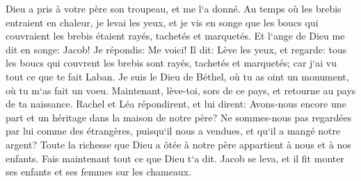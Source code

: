\verse Dieu a pris à votre père son troupeau, et me l`a donné. 
\verse Au temps où les brebis entraient en chaleur, je levai les yeux, et je vis en songe que les boucs qui couvraient les brebis étaient rayés, tachetés et marquetés. 
\verse Et l`ange de Dieu me dit en songe: Jacob! Je répondis: Me voici! 
\verse Il dit: Lève les yeux, et regarde: tous les boucs qui couvrent les brebis sont rayés, tachetés et marquetés; car j`ai vu tout ce que te fait Laban. 
\verse Je suis le Dieu de Béthel, où tu as oint un monument, où tu m`as fait un voeu. Maintenant, lève-toi, sors de ce pays, et retourne au pays de ta naissance. 
\verse Rachel et Léa répondirent, et lui dirent: Avons-nous encore une part et un héritage dans la maison de notre père? 
\verse Ne sommes-nous pas regardées par lui comme des étrangères, puisqu`il nous a vendues, et qu`il a mangé notre argent? 
\verse Toute la richesse que Dieu a ôtée à notre père appartient à nous et à nos enfants. Fais maintenant tout ce que Dieu t`a dit. 
\verse Jacob se leva, et il fit monter ses enfants et ses femmes sur les chameaux. 
